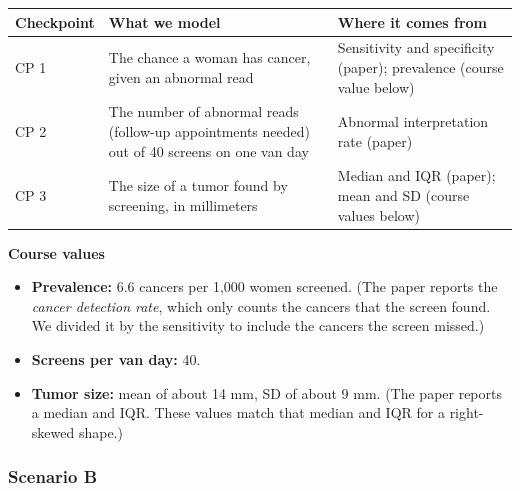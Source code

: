 \documentclass[
  letterpaper,
  DIV=11,
  numbers=noendperiod]{scrartcl}
\newcounter{none} %
\providecommand{\tightlist}{%
  \setlength{\itemsep}{0pt}\setlength{\parskip}{0pt}}
\begin{document}
{\def\LTcaptype{none} %
\begin{longtable}[]{@{}
  >{\raggedright\arraybackslash}p{}
  >{\raggedright\arraybackslash}p{}
  >{\raggedright\arraybackslash}p{}@{}}
\toprule\noalign{}
\begin{minipage}[b]{\linewidth}\raggedright
Checkpoint
\end{minipage} & \begin{minipage}[b]{\linewidth}\raggedright
What we model
\end{minipage} & \begin{minipage}[b]{\linewidth}\raggedright
Where it comes from
\end{minipage} \\
\midrule\noalign{}
\endhead
\bottomrule\noalign{}
\endlastfoot
CP 1 & The chance a woman has cancer, given an abnormal read &
Sensitivity and specificity (paper); prevalence (course value below) \\
CP 2 & The number of abnormal reads (follow-up appointments needed) out
of 40 screens on one van day & Abnormal interpretation rate (paper) \\
CP 3 & The size of a tumor found by screening, in millimeters & Median
and IQR (paper); mean and SD (course values below) \\
\end{longtable}
}

\textbf{Course values}

\begin{itemize}
\tightlist
\item
  \textbf{Prevalence:} 6.6 cancers per 1,000 women screened. (The paper
  reports the \emph{cancer detection rate}, which only counts the
  cancers that the screen found. We divided it by the sensitivity to
  include the cancers the screen missed.)
\item
  \textbf{Screens per van day:} 40.
\item
  \textbf{Tumor size:} mean of about 14 mm, SD of about 9 mm. (The paper
  reports a median and IQR. These values match that median and IQR for a
  right-skewed shape.)
\end{itemize}

\subsubsection{Scenario B}
\end{document}
